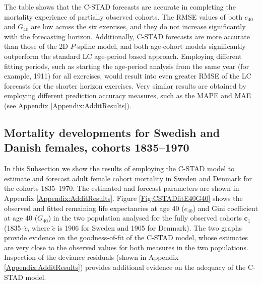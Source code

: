 \documentclass[11pt, a4paper]{article}
\begin{document}
The table shows that the C-STAD forecasts are accurate in completing the mortality experience of partially observed cohorts. The RMSE values of both $e_{40}$ and $G_{40}$  are low across the six exercises, and they do not increase significantly with the forecasting horizon. Additionally, C-STAD forecasts are more accurate than those of the 2D $P$-spline model, {\color{red} and both age-cohort models significantly outperform the standard LC age-period based approach. Employing different fitting periods, such as starting the age-period analysis from the same year (for example, 1911) for all exercises, would result into even greater RMSE of the LC forecasts for the shorter horizon exercises.} Very similar results are obtained by employing different prediction accuracy measures, such as the MAPE and MAE (see Appendix \ref{Appendix:AdditResults}). \par

\subsection{Mortality developments for Swedish and Danish females, cohorts 1835--1970}
\label{Subsec:ForecastC-STAD}
In this Subsection we show the results of employing the C-STAD model to estimate and forecast adult female cohort mortality in Sweden and Denmark for the cohorts 1835--1970. The estimated and forecast parameters are shown in Appendix \ref{Appendix:AdditResults}. Figure \ref{Fig:CSTADfitE40G40} shows the observed and fitted remaining life expectancies at age 40 ($e_{40}$) and Gini coefficient at age 40 ($G_{40}$) in the two population analysed for the fully observed cohorts $\bm{c}_1$ (1835--$\breve{c}$, where $\breve{c}$ is 1906 for Sweden and 1905 for Denmark). The two graphs provide evidence on the goodness-of-fit of the C-STAD model, whose estimates are very close to the observed values for both measures in the two populations. Inspection of the deviance residuals (shown in Appendix \ref{Appendix:AdditResults}) provides additional evidence on the adequacy of the C-STAD model. \par
\end{document}

